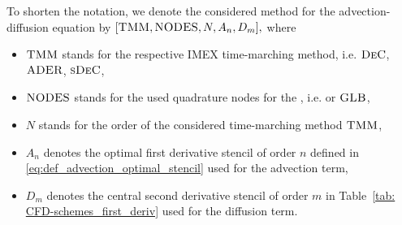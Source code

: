 \begin{definition}	\label{defi: notation_pde_method}
	To shorten the notation, we denote the considered method for the advection-diffusion equation by $[\textsc{TMM},\textsc{NODES},N, A_n,D_m],$ where
	\begin{itemize}
		\item $\textsc{TMM}$ stands for the respective IMEX time-marching method, i.e. $\textsc{DeC}$, $\textsc{ADER}$, $\textsc{sDeC}$,
		\item $\textsc{NODES}$ stands for the used quadrature nodes for the \TMM, i.e. {\eq} or $\textsc{GLB}$,
		\item $N$ stands for the order of the considered time-marching method $\textsc{TMM}$,
		\item $A_n$ denotes the optimal first derivative stencil of order $n$ defined in \eqref{eq:def_advection_optimal_stencil} used for the advection term,
		\item $D_m$ denotes the central second derivative stencil of order $m$ in Table~\ref{tab: CFD-schemes_first_deriv} used for the diffusion term.
	\end{itemize}
\end{definition}
